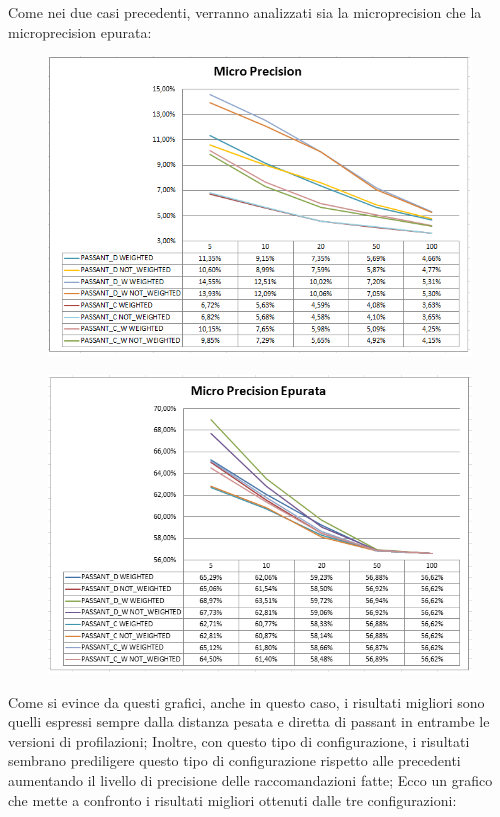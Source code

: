 Come nei due casi precedenti, verranno analizzati sia la microprecision che la microprecision epurata:
\begin{figure}[H]
	\includegraphics[width=.9\textwidth]{./images/graphs/micro_prec_Best}
\end{figure}

\begin{figure}[H]
	\includegraphics[width=.9\textwidth]{./images/graphs/micro_precT_Best}
\end{figure}

Come si evince da questi grafici, anche in questo caso, i risultati migliori sono quelli espressi sempre dalla distanza pesata e diretta di passant in entrambe le versioni di profilazioni; Inoltre, con questo tipo di configurazione, i risultati sembrano prediligere questo tipo di configurazione rispetto alle precedenti aumentando il livello di precisione delle raccomandazioni fatte; Ecco un grafico che mette a confronto i risultati migliori ottenuti dalle tre configurazioni:

